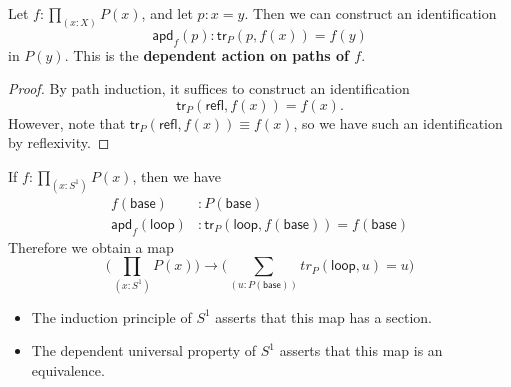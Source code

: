 \documentclass[handout]{beamer}
\newcommand{\sphere}[1]{S^{#1}}
\newcommand{\refl}{\mathsf{refl}}
\newcommand{\baseS}{\mathsf{base}}
\newcommand{\loopS}{\mathsf{loop}}
\newcommand{\apd}{\mathsf{apd}}
\newcommand{\tr}{\mathsf{tr}}
\newcommand{\apply}[2]{#1(#2)}
\begin{document}
\begin{frame}
  \begin{lemma}
    Let $f:\prod_{(x:X)}\apply{P}{x}$, and let $p:x=y$. Then we can construct an identification
    \begin{equation*}
      \apply{\apd_f}{p} : \apply{\tr_P}{p,\apply{f}{x}}=\apply{f}{y}
    \end{equation*}
    in $\apply{P}{y}$. This is the \textbf{dependent action on paths of $f$}.
  \end{lemma}\pause

  \begin{proof}
    By path induction, it suffices to construct an identification
    \begin{equation*}
      \apply{\tr_P}{\refl{},\apply{f}{x}}=\apply{f}{x}.
    \end{equation*}
    However, note that $\apply{\tr_P}{\refl{},\apply{f}{x}} \equiv \apply{f}{x}$, so we have such an identification by reflexivity.
  \end{proof}
\end{frame}

\begin{frame}
  If $f:\prod_{(x:\sphere{1})}\apply{P}{x}$, then we have
  \begin{align*}
    \apply{f}{\baseS} & : \apply{P}{\baseS} \\
    \apply{\apd_f}{\loopS} & : \apply{\tr_P}{\loopS,\apply{f}{\baseS}}= \apply{f}{\baseS}
  \end{align*}\pause
  Therefore we obtain a map
  \begin{equation*}
    \Big(\prod_{(x:\sphere{1})}\apply{P}{x}\Big)\to\Big(\sum_{(u:\apply{P}{\baseS})}\apply{tr_P}{\loopS,u}=u\Big)
  \end{equation*}\pause
  \begin{itemize}
  \item The induction principle of $\sphere{1}$ asserts that this map has a section.
  \item The dependent universal property of $\sphere{1}$ asserts that this map is an equivalence.
  \end{itemize}
\end{frame}
\end{document}
